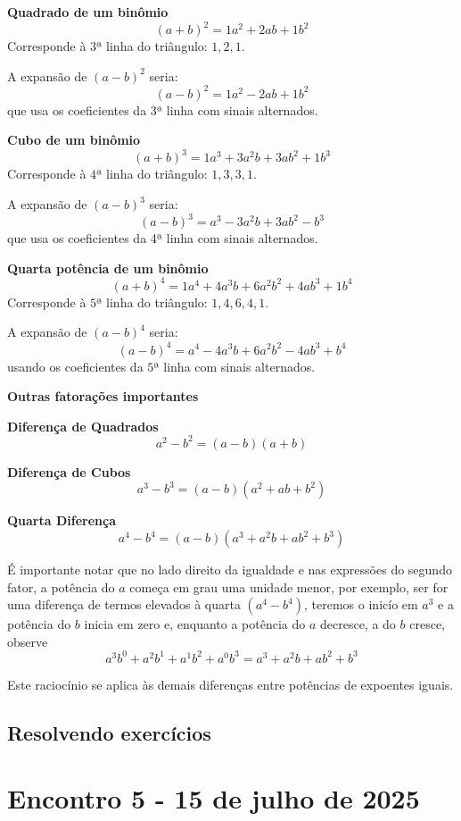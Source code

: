\documentclass[12pt,openright,twoside,a4paper]{article}
\theoremstyle{definition}
\begin{document}
\begin{snugshade}
		\textbf{Quadrado de um binômio}
		\[ (a + b)^2 = \boxed{1}a^2 + \boxed{2}ab + \boxed{1}b^2 \]
		Corresponde à $3$ª linha do triângulo: $1, 2, 1$.
		
		A expansão de $(a - b)^2$ seria:
		\[ (a - b)^2 = 1a^2 - 2ab + 1b^2 \]
		que usa os coeficientes da 3ª linha com sinais alternados.
		
		\textbf{Cubo de um binômio}
		\[ (a + b)^3 = \boxed{1}a^3 + \boxed{3}a^2b + \boxed{3}ab^2 + \boxed{1}b^3 \]
		Corresponde à $4$ª linha do triângulo: $1, 3, 3, 1$.
		
		A expansão de $(a - b)^3$ seria:
		\[ (a - b)^3 = a^3 - 3a^2b + 3ab^2 - b^3 \]
		que usa os coeficientes da 4ª linha com sinais alternados.
		
		\textbf{Quarta potência de um binômio}
		\[ (a + b)^4 = \boxed{1}a^4 + \boxed{4}a^3b + \boxed{6}a^2b^2 + \boxed{4}ab^3 + \boxed{1}b^4 \]
		Corresponde à $5$ª linha do triângulo: $1, 4, 6, 4, 1$.
		
		A expansão de $(a - b)^4$ seria:
		\[ (a - b)^4 = a^4 - 4a^3b + 6a^2b^2 - 4ab^3 + b^4 \]
		usando os coeficientes da $5$ª linha com sinais alternados.
		
		\textbf{\large{Outras fatorações importantes}}
		
		\textbf{Diferença de Quadrados}
		\[ a^2 - b^2 = (a - b)(a + b) \]
		
		\textbf{Diferença de Cubos}
		\[ a^3 - b^3 = (a - b)(a^2 + ab + b^2) \]
		
		\textbf{Quarta Diferença}
		\[ a^4 - b^4 = (a - b)(a^3 + a^2b + ab^2 + b^3) \]
		
		É importante notar que no lado direito da igualdade e nas expressões do segundo fator, a potência do $a$ começa em grau uma unidade menor, por exemplo, ser for uma diferença de termos elevados à quarta $(a^{4} - b^{4})$, teremos o inicío em $a^{3}$ e a potência do $b$ inicia em zero e, enquanto a potência do $a$ decresce, a do $b$ cresce, observe
		\[a^3b^{0} + a^2b^{1} + a^{1}b^2 + a^{0}b^3 = a^3 + a^2b + ab^2 + b^3\]
		
		Este raciocínio se aplica às demais diferenças entre potências de expoentes iguais.
	\end{snugshade}
	
	\subsection{Resolvendo exercícios}
	
	\pagebreak
	\section{Encontro 5 - 15 de julho de 2025}
	
\end{document}

